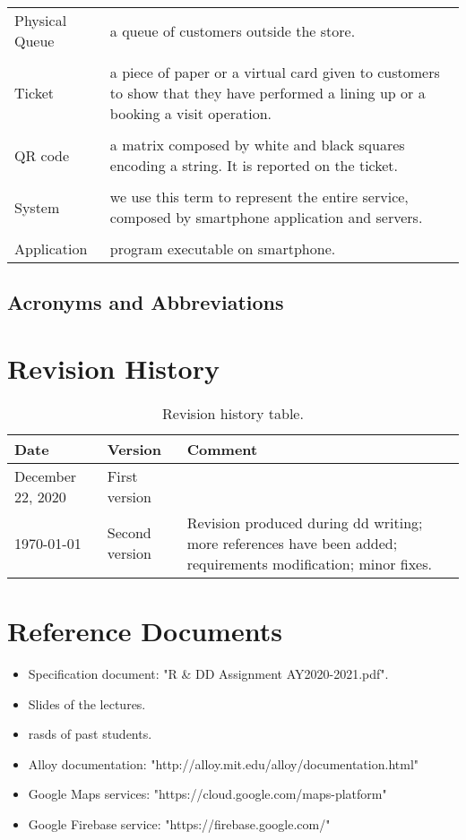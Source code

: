 \begin{tabularx}{\textwidth}{ >{\hsize=0.2\textwidth}X >{\hsize=0.8\textwidth}X}
    Physical Queue & a queue of customers outside the store.\\ \\
    Ticket & a piece of paper or a virtual card given to customers to show that they have performed a lining up or a booking a visit operation.\\ \\
    QR code & a matrix composed by white and black squares encoding a string. It is reported on the ticket.         \\ \\
    System & we use this term to represent the entire service, composed by smartphone application and servers.\\ \\
    Application & program executable on smartphone.
\end{tabularx}

\subsection{Acronyms and Abbreviations}
\printglossary


\section{Revision History}

\begin{table}[H]
    \centering
    \begin{tabular}{ m{} | m{} | m{} }
        \textbf{Date}     & \textbf{Version}	& \textbf{Comment}\\
        \hline
        December 22, 2020 & First version		&          \\
        \hline
        \today            & Second version		& Revision produced during \gls{dd} writing; more references have been added; requirements modification; minor fixes.
    \end{tabular}
    \caption{Revision history table.}
    \label{table:revisionHistory}
\end{table}


\section{Reference Documents}

\begin{itemize}
    \item Specification document: "R \& DD Assignment AY2020-2021.pdf".
    \item Slides of the lectures.
    \item \glspl{rasd} of past students.
    \item Alloy documentation: "http://alloy.mit.edu/alloy/documentation.html"
    \item Google Maps services: "https://cloud.google.com/maps-platform"
    \item Google Firebase service: "https://firebase.google.com/"
\end{itemize}



